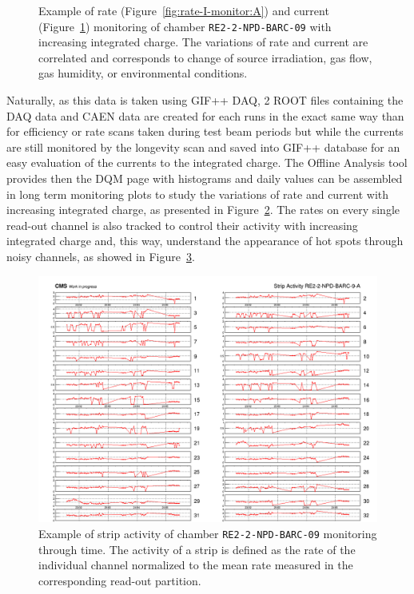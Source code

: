 \begin{figure}[H]
\begin{subfigure}{0.5\linewidth}
        	\caption{\label{fig:rate-I-monitor:B}}
    	\end{subfigure}
		\caption{\label{fig:rate-I-monitor} Example of rate (Figure~\ref{fig:rate-I-monitor:A}) and current (Figure~\ref{fig:rate-I-monitor:B}) monitoring of chamber \texttt{RE2-2-NPD-BARC-09} with increasing integrated charge. The variations of rate and current are correlated and corresponds to change of source irradiation, gas flow, gas humidity, or environmental conditions.}
	\end{figure}
	
	Naturally, as this data is taken using GIF++ DAQ, 2 ROOT files containing the DAQ data and CAEN data are created for each runs in the exact same way than for efficiency or rate scans taken during test beam periods but while the currents are still monitored by the longevity scan and saved into GIF++ database for an easy evaluation of the currents to the integrated charge. The Offline Analysis tool provides then the DQM page with histograms and daily values can be assembled in long term monitoring plots to study the variations of rate and current with increasing integrated charge, as presented in Figure~\ref{fig:rate-I-monitor}. The rates on every single read-out channel is also tracked to control their activity with increasing integrated charge and, this way, understand the appearance of hot spots through noisy channels, as showed in Figure~\ref{fig:stripactivity}.

	\begin{figure}[H]
        \centering
		\includegraphics[width = \linewidth]{fig/chapt5/GIFpp-Strip-Activity.png}
		\caption{\label{fig:stripactivity} Example of strip activity of chamber \texttt{RE2-2-NPD-BARC-09} monitoring through time. The activity of a strip is defined as the rate of the individual channel normalized to the mean rate measured in the corresponding read-out partition.}
	\end{figure}
	
